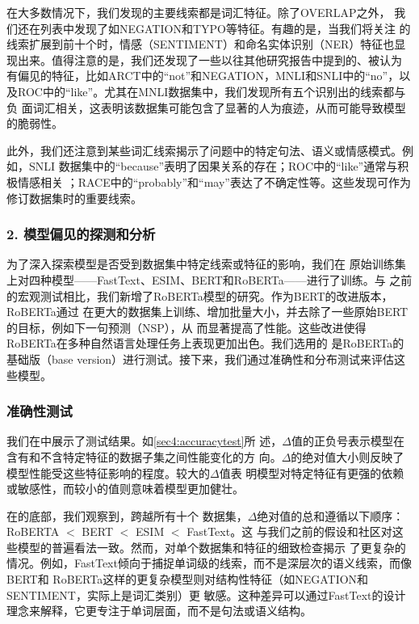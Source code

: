 在大多数情况下，我们发现的主要线索都是词汇特征。除了OVERLAP之外，
我们还在列表中发现了如NEGATION和TYPO等特征。有趣的是，当我们将关注
的线索扩展到前十个时，情感（SENTIMENT）和命名实体识别（NER）特征也显
现出来。值得注意的是，我们还发现了一些以往其他研究报告中提到的、被认为
有偏见的特征，比如ARCT中的``not''和NEGATION，MNLI和SNLI中的``no''，以
及ROC中的``like''。尤其在MNLI数据集中，我们发现所有五个识别出的线索都与负
面词汇相关，这表明该数据集可能包含了显著的人为痕迹，从而可能导致模型的脆弱性。

此外，我们还注意到某些词汇线索揭示了问题中的特定句法、语义或情感模式。例如，SNLI
数据集中的``because''表明了因果关系的存在；ROC中的``like''通常与积极情感相关
；RACE中的``probably''和``may''表达了不确定性等。这些发现可作为修订数据集时的重要线索。

\subsubsection*{2. 模型偏见的探测和分析}
为了深入探索模型是否受到数据集中特定线索或特征的影响，我们在
原始训练集上对四种模型——FastText、ESIM、BERT和RoBERTa——进行了训练。与
之前的宏观测试相比，我们新增了RoBERTa模型的研究。作为BERT的改进版本，RoBERTa通过
在更大的数据集上训练、增加批量大小，并去除了一些原始BERT的目标，例如下一句预测（NSP），从
而显著提高了性能。这些改进使得RoBERTa在多种自然语言处理任务上表现更加出色。我们选用的
是RoBERTa的基础版（base version）进行测试。接下来，我们通过准确性和分布测试来评估这些模型。

\subsubsection*{准确性测试}
我们在中展示了测试结果。如\ref{sec4:accuracytest}所
述，$\Delta$值的正负号表示模型在含有和不含特定特征的数据子集之间性能变化的方
向。$\Delta$的绝对值大小则反映了模型性能受这些特征影响的程度。较大的$\Delta$值表
明模型对特定特征有更强的依赖或敏感性，而较小的值则意味着模型更加健壮。

在的底部，我们观察到，跨越所有十个
数据集，$\Delta$绝对值的总和遵循以下顺序：RoBERTA $<$ BERT $<$ ESIM $<$ FastText。这
与我们之前的假设和社区对这些模型的普遍看法一致。然而，对单个数据集和特征的细致检查揭示
了更复杂的情况。例如，FastText倾向于捕捉单词级的线索，而不是深层次的语义线索，而像BERT和
RoBERTa这样的更复杂模型则对结构性特征（如NEGATION和SENTIMENT，实际上是词汇类别）更
敏感。这种差异可以通过FastText的设计理念来解释，它更专注于单词层面，而不是句法或语义结构。

